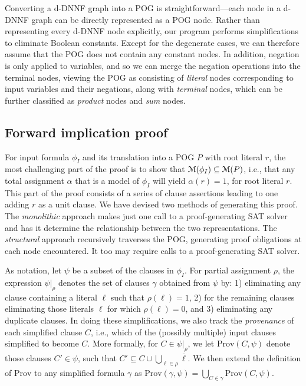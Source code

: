 \documentclass[letterpaper,USenglish,cleveref, autoref, thm-restate]{lipics-v2021}
\newcommand{\obar}[1]{\overline{#1}}
\newcommand{\lit}{\ell}
\newcommand{\assign}{\alpha}
\newcommand{\passign}{\rho}
\newcommand{\modelset}{{\cal M}}
\newcommand{\prov}{\textrm{Prov}}
\newcommand{\inputformula}{\phi_I}
\newcommand{\simplify}[2]{#1|_{#2}}
\newcommand{\progname}[1]{\textsc{#1}}
\newcommand{\dfour}{\progname{D4}}
\begin{document}
Converting a d-DNNF
graph into a POG is straightforward---each node in a d-DNNF graph can
be directly represented as a POG node.  Rather than representing every
d-DNNF node explicitly, our program performs simplifications to
eliminate Boolean constants.
Except for the degenerate cases,
we can therefore assume
that the POG does not contain any constant nodes.
In addition, negation is only
applied to variables, and so we can merge the negation operations into the terminal nodes,
viewing the POG as consisting
of {\em literal} nodes corresponding to input variables and their negations, along with
{\em terminal} nodes, which can be further classified as {\em product} nodes and {\em sum} nodes.

\subsection{Forward implication proof}

For input formula $\inputformula$ and its translation into a POG $P$
with root literal $r$, the most challenging part of the proof is to
show that $\modelset(\inputformula) \subseteq \modelset(P)$, i.e.,
that any total assignment $\alpha$ that is a model of $\inputformula$
will yield $\assign(r) = 1$, for root literal $r$.  This part of the
proof consists of a series of clause assertions leading to one adding
$r$ as a unit clause.  We have devised two methods of generating this
proof.  The {\em monolithic} approach makes just one call to a
proof-generating SAT solver and has it determine the relationship
between the two representations.  The {\em structural} approach
recursively traverses the POG, generating proof obligations at each
node encountered.  It too may require calls to a proof-generating SAT
solver.

As notation,
let $\psi$ be a subset of the clauses in $\inputformula$.
For partial assignment
$\passign$, the expression  $\simplify{\psi}{\passign}$ denotes the set of clauses $\gamma$
obtained from $\psi$ by: 1) eliminating any
clause containing a literal $\lit$ such that $\passign(\lit) = 1$,
2) for the remaining clauses eliminating those literals $\lit$ for
which $\passign(\lit) = 0$, and 3) eliminating any duplicate clauses.
In doing these simplifications, we also track the {\em provenance}
of each simplified clause $C$, i.e., which of the (possibly multiple) input clauses simplified to become $C$.
More formally, for $C \in \simplify{\psi}{\passign}$, we let $\prov(C, \psi)$ denote
those clauses $C' \in \psi$, such that
$C' \subseteq C \cup \bigcup_{\lit \in \passign} \obar{\lit}$.
We then extend the definition of $\prov$ to any simplified formula
$\gamma$ as $\prov(\gamma, \psi) = \bigcup_{C \in \gamma} \prov(C, \psi)$.
\end{document}
